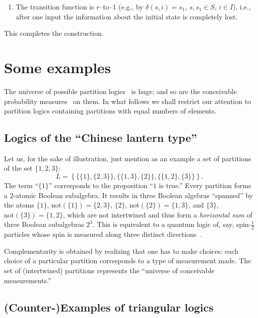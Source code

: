 \begin{enumerate}
\begin{enumerate}
\begin{enumerate}
\item
The transition function is $r$--to--1 (e.g., by $\delta (s,i)=s_1$, $s,s_1\in S$,
$i\in I$), i.e., after one input the information about the
initial state is completely lost.
\end{enumerate}
This completes the construction.
\end{enumerate}
\end{enumerate}



\section{Some examples}

The universe of possible partition logics~\cite{svozil-93,dvur-pul-svo,schaller-96,svozil-2008-ql} is huge;
and so are the conceivable probability measures~\cite{svozil-2016-s} on them.
In what follows we shall restrict our attention to partition logics containing partitions with equal numbers of elements.


\subsection{Logics of the ``Chinese lantern type''}

Let us, for the sake of illustration, just mention as an example a set of partitions of the set $\{1,2,3\}$:
\begin{equation}
L=
\left\{
\{ \{ 1\}, \{2,3\}\},
\{\{1,3\} , \{ 2\}\},
\{\{1,2\} , \{ 3\}\}
\right\} .
\end{equation}
The term
``$\{ 1\}$''
corresponds to the proposition ``$1$ is true.''
Every partition forms a $2$-atomic Boolean subalgebra.
It results in three Boolean algebras
``spanned'' by the atoms
$\{ 1\}$, $\textrm{not}(\{ 1\}) = \{2,3\}$,
$\{ 2\}$, $\textrm{not}(\{ 2\}) = \{1,3\}$, and
$\{ 3\}$, $\textrm{not}(\{ 3\}) = \{1,2\}$,
which are not intertwined and thus form a
{\em horizontal sum}
 of three Boolean subalgebras $2^3$.
This is equivalent to a quantum logic of, say, spin-$\frac{1}{2}$
particles whose spin is measured along three distinct directions~\cite{svozil-ql}.

Complementarity is obtained by realizing that one has to make choices: each choice of a particular partition corresponds to a type of measurement made.
The set of (intertwined) partitions represents the ``universe of conceivable measurements.''

\subsection{(Counter-)Examples of triangular logics}


